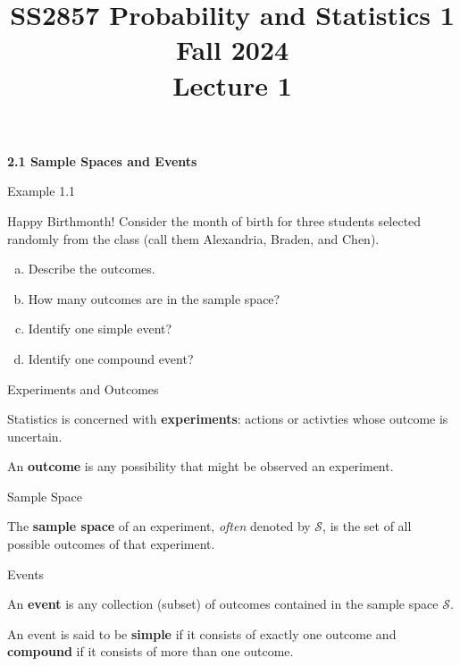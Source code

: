 \documentclass[aspectratio=169,xcolor=pdftex,dvipsnames,table]{beamer}\usepackage[]{graphicx}\usepackage[]{xcolor}
\title[SS2857 -- Lecture 1]{SS2857 Probability and Statistics 1\\
  Fall 2024\\
  \vspace{.2in}
  Lecture 1}
\date{}
\begin{document}
{

\begin{frame}
  \maketitle
\end{frame}
}


\begin{frame}
  \begin{center}
    \Large{\textbf{2.1 Sample Spaces and Events}}
  \end{center}
\end{frame}

\begin{frame}{Example 1.1}
  \begin{block}{Happy Birthmonth!}
    Consider the month of birth for three students selected randomly from the class (call them Alexandria, Braden, and Chen). 
    \begin{enumerate}[a)]
    \item Describe the outcomes.
    \item How many outcomes are in the sample space?
    \item Identify one simple event?
    \item Identify one compound event?
    \end{enumerate}
  \end{block}
\end{frame}

\begin{frame}{Experiments and Outcomes}

Statistics is concerned with \textbf{experiments}: actions or activties whose outcome is uncertain.

\bigskip

An \textbf{outcome} is any possibility that might be observed an experiment. 

\end{frame}

\begin{frame}{Sample Space}

The \textbf{sample space} of an experiment, \textit{often} denoted by $\mathcal{S}$, is the set of all possible outcomes of that experiment.

\end{frame}

\begin{frame}{Events}

An \textbf{event} is any collection (subset) of outcomes contained in the sample space $\mathcal{S}$.

An event is said to be \textbf{simple} if it consists of exactly one outcome and \textbf{compound} if it consists of more than one outcome.
\end{frame}
\end{document}
